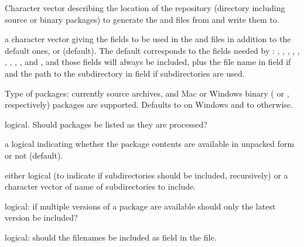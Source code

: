 \begin{Arguments}
\begin{ldescription}
\item[\code{dir}] Character vector describing the location of the repository
(directory including source or binary packages) to generate the
 and  files from and write them to.

\item[\code{fields}] 
a character vector giving the fields to be used in the
 and  files in addition to the
default ones, or  (default).  The default corresponds to
the fields needed by :
, , ,
, , ,
, , ,
 and , and those fields will always
be included, plus
the file name in field  if 
and the path to the subdirectory in field  if subdirectories
are used.

\item[\code{type}] 
Type of packages: currently source  archives, and Mac
or Windows binary ( or , respectively)
packages are supported.  Defaults to  on Windows
and to  otherwise.

\item[\code{verbose}] logical.  Should packages be listed as they are
processed?
\item[\code{unpacked}] a logical indicating whether the package contents are
available in unpacked form or not (default).
\item[\code{subdirs}] either logical (to indicate if subdirectories should be
included, recursively) or a character vector of name of subdirectories
to include.
\item[\code{latestOnly}] logical: if multiple versions of a package are
available should only the latest version be included?
\item[\code{addFiles}] logical: should the filenames be included as field
 in the  file.
\end{ldescription}
\end{Arguments}
%
